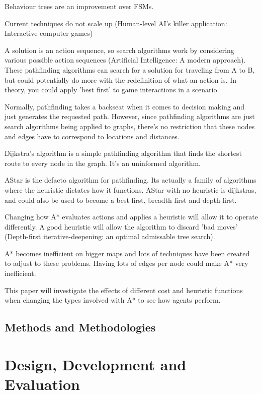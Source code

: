 \documentclass[10pt]{article}
\begin{document}
Behaviour trees are an improvement over FSMs.

Current techniques do not scale up (Human-level AI's killer application: Interactive computer games)

A solution is an action sequence, so search algorithms work by considering various possible action sequences (Artificial Intelligence: A modern approach). These pathfinding algorithms can search for a solution for traveling from A to B, but could potentially do more with the redefinition of what an action is. In theory, you could apply 'best first' to game interactions in a scenario.

Normally, pathfinding takes a backseat when it comes to decision making and just generates the requested path. However, since pathfinding algorithms are just search algorithms being applied to graphs, there's no restriction that these nodes and edges have to correspond to locations and distances.

Dijkstra's algorithm is a simple pathfinding algorithm that finds the shortest route to every node in the graph. It's an uninformed algorithm.

AStar is the defacto algorithm for pathfinding. Its actually a family of algorithms where the heuristic dictates how it functions. AStar with no heuristic is dijkstras, and could also be used to become a best-first, breadth first and depth-first.

Changing how A* evaluates actions and applies a heuristic will allow it to operate differently. A good heuristic will allow the algorithm to discard 'bad moves' (Depth-first iterative-deepening: an optimal admissable tree search).

A* becomes inefficient on bigger maps and lots of techniques have been created to adjust to these problems. Having lots of edges per node could make A* very inefficient.

This paper will investigate the effects of different cost and heuristic functions when changing the types involved with A* to see how agents perform.

\subsection{Methods and Methodologies}

\section {Design, Development and Evaluation}
\end{document}
